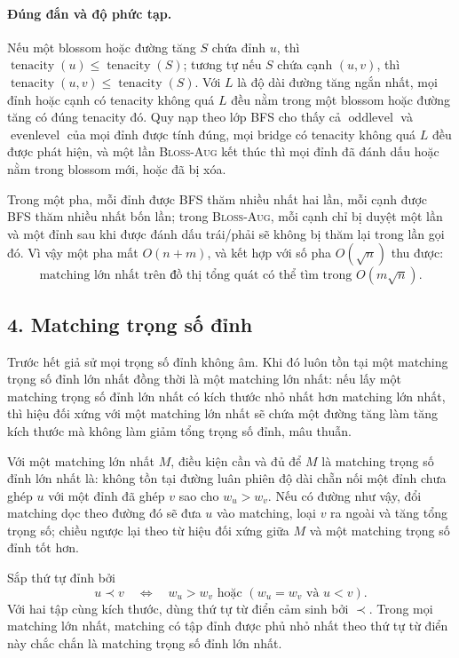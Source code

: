 \documentclass[11pt]{article}
\begin{document}
\paragraph{Đúng đắn và độ phức tạp.}
Nếu một blossom hoặc đường tăng \(S\) chứa đỉnh \(u\), thì
\(\operatorname{tenacity}(u)\le \operatorname{tenacity}(S)\); tương tự nếu
\(S\) chứa cạnh \((u,v)\), thì
\(\operatorname{tenacity}(u,v)\le \operatorname{tenacity}(S)\). Với \(L\) là
độ dài đường tăng ngắn nhất, mọi đỉnh hoặc cạnh có tenacity không quá \(L\)
đều nằm trong một blossom hoặc đường tăng có đúng tenacity đó. Quy nạp theo
lớp BFS cho thấy cả \(\operatorname{oddlevel}\) và
\(\operatorname{evenlevel}\) của mọi đỉnh được tính đúng, mọi bridge có
tenacity không quá \(L\) đều được phát hiện, và một lần \textsc{Bloss-Aug}
kết thúc thì mọi đỉnh đã đánh dấu hoặc nằm trong blossom mới, hoặc đã bị xóa.

Trong một pha, mỗi đỉnh được BFS thăm nhiều nhất hai lần, mỗi cạnh được BFS
thăm nhiều nhất bốn lần; trong \textsc{Bloss-Aug}, mỗi cạnh chỉ bị duyệt một
lần và một đỉnh sau khi được đánh dấu trái/phải sẽ không bị thăm lại trong
lần gọi đó. Vì vậy một pha mất \(O(n+m)\), và kết hợp với số pha
\(O(\sqrt n)\) thu được:
\[
  \text{matching lớn nhất trên đồ thị tổng quát có thể tìm trong }
  O(m\sqrt n).
\]

\subsection*{4. Matching trọng số đỉnh}

Trước hết giả sử mọi trọng số đỉnh không âm. Khi đó luôn tồn tại một matching
trọng số đỉnh lớn nhất đồng thời là một matching lớn nhất: nếu lấy một
matching trọng số đỉnh lớn nhất có kích thước nhỏ nhất hơn matching lớn nhất,
thì hiệu đối xứng với một matching lớn nhất sẽ chứa một đường tăng làm tăng
kích thước mà không làm giảm tổng trọng số đỉnh, mâu thuẫn.

Với một matching lớn nhất \(M\), điều kiện cần và đủ để \(M\) là matching
trọng số đỉnh lớn nhất là: không tồn tại đường luân phiên độ dài chẵn nối một
đỉnh chưa ghép \(u\) với một đỉnh đã ghép \(v\) sao cho \(w_u>w_v\). Nếu có
đường như vậy, đổi matching dọc theo đường đó sẽ đưa \(u\) vào matching, loại
\(v\) ra ngoài và tăng tổng trọng số; chiều ngược lại theo từ hiệu đối xứng
giữa \(M\) và một matching trọng số đỉnh tốt hơn.

Sắp thứ tự đỉnh bởi
\[
  u\prec v
  \quad\Longleftrightarrow\quad
  w_u>w_v \text{ hoặc } (w_u=w_v \text{ và } u<v).
\]
Với hai tập cùng kích thước, dùng thứ tự từ điển cảm sinh bởi \(\prec\). Trong
mọi matching lớn nhất, matching có tập đỉnh được phủ nhỏ nhất theo thứ tự từ
điển này chắc chắn là matching trọng số đỉnh lớn nhất.
\end{document}
